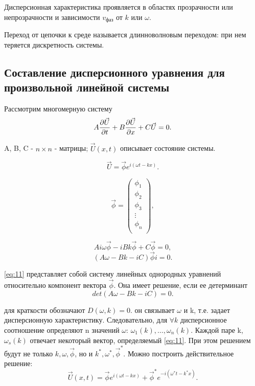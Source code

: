 Дисперсионная характеристика проявляется в областях прозрачности или непрозрачности и зависимости $v_\text{фаз}$ от $k$ или $\omega$.


Переход от цепочки к среде называется длинноволновым переходом: при нем теряется дискретность системы.

\subsection{Составление дисперсионного уравнения для произвольной линейной системы}

Рассмотрим многомерную систему
\begin{equation}
	A\pdv{\vec{U}}{t}+B\pdv{\vec{U}}{x}+C\vec{U}=0.
	\label{eq:9}
\end{equation}

A, B, C - $n\times n$ - матрицы; $\vec{U}(x,t)$ описывает состояние системы.

\begin{equation}
	\vec{U}=\vec{\phi} e^{i(\omega t - kx)}.
	\label{eq:10}
\end{equation}

\begin{equation*}
	\vec\phi=
	\begin{pmatrix}
		\phi_1 \\
		\phi_2 \\
		\phi_3 \\
		\vdots \\
		\phi_n \\
	\end{pmatrix}
	,
\end{equation*}

\begin{equation*}
	Ai\omega\vec\phi-iBk\vec\phi+C\vec\phi=0,
\end{equation*}
\begin{equation}
	(A\omega-Bk-iC)\vec\phi i=0.
	\label{eq:11}
\end{equation}

\eqref{eq:11} представляет собой систему линейных однородных уравнений относительно компонент вектора $\vec\phi$. Она имеет решение, если ее детерминант
\begin{equation}
	det(A\omega-Bk-iC)=0.
	\label{eq:12}
\end{equation}

для краткости обозначают $D(\omega,k)=0$. он связывает $\omega$ и k, т.е. задает дисперсионную характеристику. Следовательно, для $\forall k$ дисперсионное соотношение определяют n значений $\omega$: $\omega_1(k), \dots, \omega_n(k)$. Каждой паре k, $\omega_s(k)$ отвечает некоторый вектор, определяемый \eqref{eq:11}. При этом решением будут не только $k, \omega, \vec\phi$, но и $k^*, \omega^*, \vec\phi^*$. Можно построить действительное решение:
\begin{equation}
	\vec{U}(x,t)=\vec\phi e^{i(\omega t-kx)}+\vec\phi^* e^{-i(\omega^* t-k^*x)}.
	\label{eq:13}
\end{equation}

